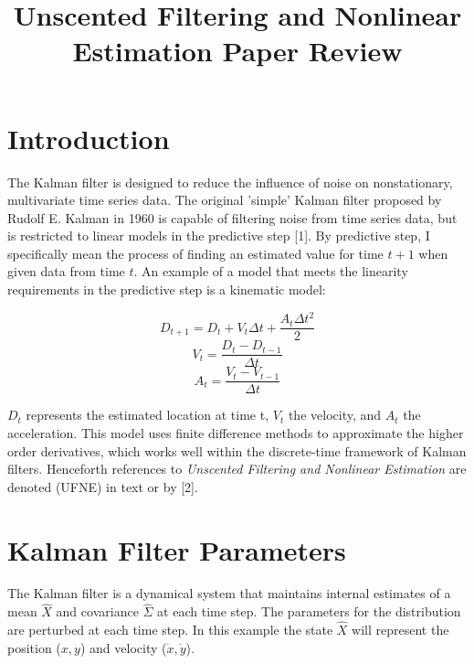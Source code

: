 \documentclass{article}
\begin{document}
\title{Unscented Filtering and Nonlinear Estimation Paper Review}
\date{}
\maketitle
\section{Introduction}
The Kalman filter is designed to reduce the influence of noise on nonstationary, multivariate time series data. The original 'simple' Kalman filter proposed by Rudolf E. Kalman in 1960 is capable of filtering noise from time series data, but is restricted to linear models in the predictive step [1]. By predictive step, I specifically mean the process of finding an estimated value for time $t + 1$ when given data from time $t$. An example of a model that meets the linearity requirements in the predictive step is a kinematic model:

\[
   D_{t+1} = D_t + V_t \Delta t + \frac{A_t\Delta t^2}{2}
\]
\[
   V_t = \frac{D_t - D_{t - 1}}{\Delta t}
\]
\[
   A_t = \frac{V_t - V_{t - 1}}{\Delta t}
\]

$D_{t}$ represents the estimated location at time t, $V_t$ the velocity, and $A_t$ the acceleration. This model uses finite difference methods to approximate the higher order derivatives, which works well within the discrete-time framework of Kalman filters. Henceforth references to \textit{Unscented Filtering and Nonlinear Estimation} are denoted (UFNE) in text or by [2].

\section{Kalman Filter Parameters}
The Kalman filter is a dynamical system that maintains internal estimates of a mean $\hat X$ and covariance $\hat \Sigma$ at each time step. The parameters for the distribution are perturbed at each time step. In this example the state $\hat X$ will represent the position ($x, y$) and velocity ($\dot x, \dot y$).
\end{document}
